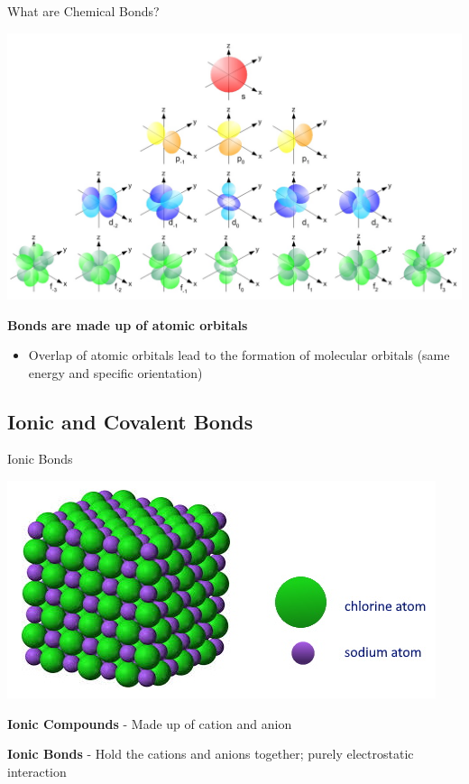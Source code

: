 \documentclass[11pt]{beamer}
\begin{document}
\begin{frame}{What are Chemical Bonds?}
  \begin{center}
    \includegraphics[width=0.8\linewidth]{single_elect_orb}
  \end{center}
  \textbf{Bonds are made up of atomic orbitals}
  \begin{itemize}
  \item Overlap of atomic orbitals lead to the formation of molecular
    orbitals (same energy and specific orientation)
  \end{itemize}
\end{frame}

\subsection{Ionic and Covalent Bonds}

\begin{frame}{Ionic Bonds}
  \begin{center}
    \includegraphics[width=0.6\linewidth]{nacl}
  \end{center}
  
  \textbf{Ionic Compounds} - Made up of cation and anion

  \textbf{Ionic Bonds} - Hold the cations and anions together;
  purely electrostatic interaction

\end{frame}
\end{document}
